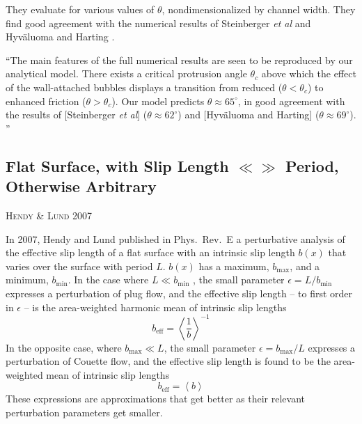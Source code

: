 \documentclass[12pt, a4paper, twoside, openright]{book}
\newcommand{\beff}{\ensuremath{b_{\mathrm{eff}}}}
\newcommand{\bmin}{\ensuremath{b_{\mathrm{min}}}}
\newcommand{\bmax}{\ensuremath{b_{\mathrm{max}}}}
\newcommand{\paper}[1]
         {\colorbox[gray]{0.8}{ \textsc{#1}}
         
         }
\begin{document}
They evaluate for various values of $\theta$, nondimensionalized by channel width.  They find good agreement with the numerical results of Steinberger \emph{et al} \cite{Steinberger2007} and Hyv\"{a}luoma and Harting \cite{HyvaluomaHarting2008}.

``The main features of the full numerical results are seen to be reproduced by our analytical model.  There exists a critical protrusion angle $ \theta_c$ above which the effect of the wall-attached bubbles displays a transition from reduced ($ \theta < \theta_c $) to enhanced friction ($ \theta > \theta_c $).  Our model predicts $ \theta \approx 65^{\circ} $, in good agreement with the results of [Steinberger \emph{et al}] ($ \theta \approx 62^{\circ} $) and [Hyv\"{a}luoma and Harting] ($ \theta \approx 69^{\circ} $). ''

\subsection{Flat Surface, with Slip Length $\ll \gg$ Period,\\ Otherwise Arbitrary}

\paper{Hendy \& Lund 2007}


In 2007, Hendy and Lund published in Phys.\ Rev.\ E \cite{HendyLund2007} a perturbative analysis of the effective slip length of a flat surface with an intrinsic slip length $b(x)$ that varies over the surface with period $L$.  $b(x)$ has a maximum, $\bmax$, and a minimum, $\bmin$.  In the case where $ L \ll \bmin $ , the small parameter $\epsilon = L / \bmin$ expresses a perturbation of plug flow, and the effective slip length -- to first order in $\epsilon$ -- is the area-weighted harmonic mean of intrinsic slip lengths
\begin{equation}
\beff = \left< \frac{1}{b} \right>^{-1}
\end{equation}
In the opposite case, where $\bmax \ll L$, the small parameter $\epsilon = \bmax / L$ expresses a perturbation of Couette flow, and the effective slip length is found to be the area-weighted mean of intrinsic slip lengths
\begin{equation}
\beff = \left< b \right>
\end{equation}
These expressions are approximations that get better as their relevant perturbation parameters get smaller.
\end{document}

